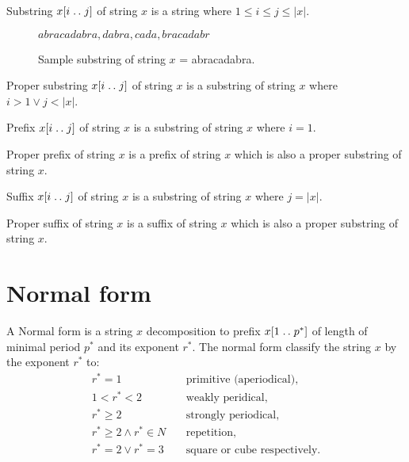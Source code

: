 \begin{dt}{Substring}
  $x[i \mathrel{{.}\,{.}}\nobreak j]$ of string $x$ is a string where $1 \leq i \leq j \leq |x|$.
\end{dt}

\begin{figure}
    $abracadabra, dabra, cada, bracadabr$
\caption{Sample substring of string $x$ = abracadabra.}
\end{figure}

\begin{dt}{Proper substring}
  $x[i \mathrel{{.}\,{.}}\nobreak j]$ of string $x$ is a substring of string $x$ where $i > 1 \lor j < |x|$.
\end{dt}

\begin{dt}{Prefix}
  $x[i \mathrel{{.}\,{.}}\nobreak j]$ of string $x$ is a substring of string $x$ where $i = 1$.
\end{dt}

\begin{dt}{Proper prefix}
  of string $x$ is a prefix of string $x$ which is also a proper substring of string $x$.
\end{dt}

\begin{dt}{Suffix}
  $x[i \mathrel{{.}\,{.}}\nobreak j]$ of string $x$ is a substring of string $x$ where $j = |x|$.
\end{dt}

\begin{dt}{Proper suffix}
  of string $x$ is a suffix of string $x$ which is also a proper substring of string $x$.
\end{dt}

\section{Normal form}

\begin{dt}{A Normal form}
  is a string $x$ decomposition to prefix $x[1 \mathrel{{.}\,{.}}\nobreak p^*]$ of length of minimal period $p^*$ and its exponent $r^*$. The normal form classify the string $x$ by the exponent $r^*$ to:
  \begin{align*}
    r^*=1 & & \ \text{primitive (aperiodical),}\\
    1<r^*<2 & & \ \text{weakly peridical,}\\
    r^* \geq 2 & & \ \text{strongly periodical,}\\
    r^* \geq 2 \land r^* \in N & & \ \text{repetition,}\\
    r^*=2 \lor r^*=3 & & \ \text{square or cube respectively.}
  \end{align*}
\end{dt}

